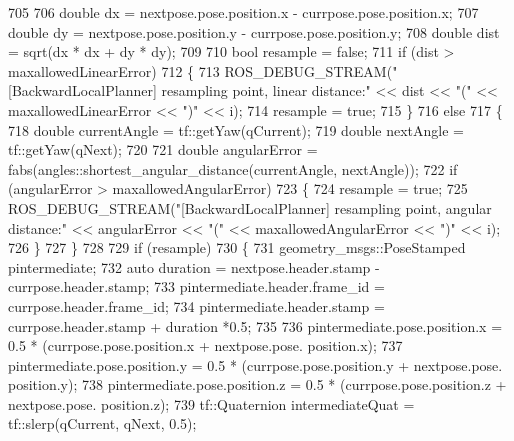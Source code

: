 \begin{DoxyCode}
705 
706                 \textcolor{keywordtype}{double} dx = nextpose.pose.position.x - currpose.pose.position.x;
707                 \textcolor{keywordtype}{double} dy = nextpose.pose.position.y - currpose.pose.position.y;
708                 \textcolor{keywordtype}{double} dist = sqrt(dx * dx + dy * dy);
709 
710                 \textcolor{keywordtype}{bool} resample = \textcolor{keyword}{false};
711                 \textcolor{keywordflow}{if} (dist > maxallowedLinearError)
712                 \{
713                     ROS\_DEBUG\_STREAM(\textcolor{stringliteral}{"[BackwardLocalPlanner] resampling point, linear distance:"} << dist <<
       \textcolor{stringliteral}{"("} << maxallowedLinearError << \textcolor{stringliteral}{")"} << i);
714                     resample = \textcolor{keyword}{true};
715                 \}
716                 \textcolor{keywordflow}{else}
717                 \{
718                     \textcolor{keywordtype}{double} currentAngle = tf::getYaw(qCurrent);
719                     \textcolor{keywordtype}{double} nextAngle = tf::getYaw(qNext);
720 
721                     \textcolor{keywordtype}{double} angularError = fabs(angles::shortest\_angular\_distance(currentAngle, nextAngle));
722                     \textcolor{keywordflow}{if} (angularError > maxallowedAngularError)
723                     \{
724                         resample = \textcolor{keyword}{true};
725                         ROS\_DEBUG\_STREAM(\textcolor{stringliteral}{"[BackwardLocalPlanner] resampling point, angular distance:"} << 
      angularError << \textcolor{stringliteral}{"("} << maxallowedAngularError << \textcolor{stringliteral}{")"} << i);
726                     \}
727                 \}
728 
729                 \textcolor{keywordflow}{if} (resample)
730                 \{
731                     geometry\_msgs::PoseStamped pintermediate;
732                     \textcolor{keyword}{auto} duration = nextpose.header.stamp - currpose.header.stamp;
733                     pintermediate.header.frame\_id = currpose.header.frame\_id;
734                     pintermediate.header.stamp = currpose.header.stamp + duration *0.5;
735 
736                     pintermediate.pose.position.x = 0.5 * (currpose.pose.position.x + nextpose.pose.
      position.x);
737                     pintermediate.pose.position.y = 0.5 * (currpose.pose.position.y + nextpose.pose.
      position.y);
738                     pintermediate.pose.position.z = 0.5 * (currpose.pose.position.z + nextpose.pose.
      position.z);
739                     tf::Quaternion intermediateQuat = tf::slerp(qCurrent, qNext, 0.5);

\end{DoxyCode}

